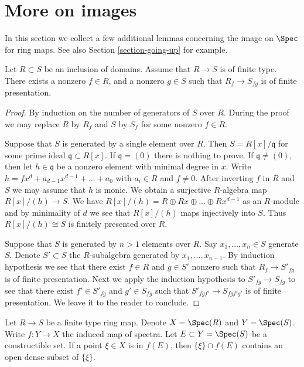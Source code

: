 \section{More on images}
\label{section-more-images}

\noindent
In this section we collect a few additional lemmas concerning the image
on $\Spec$ for ring maps. See also Section \ref{section-going-up}
for example.

\begin{lemma}
\label{lemma-generic-finite-presentation}
Let $R \subset S$ be an inclusion of domains.
Assume that $R \to S$ is of finite type.
There exists a nonzero $f \in R$, and a nonzero $g \in S$
such that $R_f \to S_{fg}$ is of finite presentation.
\end{lemma}

\begin{proof}
By induction on the number of generators of $S$ over $R$.
During the proof we may replace $R$ by $R_f$ and $S$ by $S_f$
for some nonzero $f \in R$.

\medskip\noindent
Suppose that $S$ is generated by a single element
over $R$. Then $S = R[x]/\mathfrak q$ for some
prime ideal $\mathfrak q \subset R[x]$. If $\mathfrak q = (0)$
there is nothing to prove. If $\mathfrak q \not = (0)$,
then let $h \in \mathfrak q$ be a nonzero element with minimal
degree in $x$. Write $h = f x^d + a_{d - 1} x^{d - 1} + \ldots + a_0$
with $a_i \in R$ and $f \not = 0$. After inverting $f$
in $R$ and $S$ we may assume that $h$ is monic. We obtain
a surjective $R$-algebra map $R[x]/(h) \to S$.
We have $R[x]/(h) = R \oplus Rx \oplus \ldots \oplus Rx^{d - 1}$
as an $R$-module and by minimality of $d$ we see that
$R[x]/(h)$ maps injectively into $S$. Thus $R[x]/(h) \cong S$
is finitely presented over $R$.

\medskip\noindent
Suppose that $S$ is generated by $n > 1$ elements over $R$.
Say $x_1, \ldots, x_n \in S$ generate $S$. Denote $S' \subset S$
the $R$-subalgebra generated by $x_1, \ldots, x_{n-1}$. By induction
hypothesis we see that there exist $f\in R$ and $g \in S'$
nonzero such that $R_f \to S'_{fg}$ is of finite presentation.
Next we apply the induction hypothesis to $S'_{fg} \to S_{fg}$
to see that there exist $f' \in S'_{fg}$ and
$g' \in S_{fg}$ such that $S'_{fgf'} \to S_{fgf'g'}$
is of finite presentation. We leave it to the reader to conclude.
\end{proof}

\begin{lemma}
\label{lemma-characterize-image-finite-type}
Let $R \to S$ be a finite type ring map.
Denote $X = \Spec(R)$ and $Y = \Spec(S)$.
Write $f : Y \to X$ the induced
map of spectra. Let $E \subset Y = \Spec(S)$ be a
constructible set.
If a point $\xi \in X$ is in $f(E)$, then
$\overline{\{\xi\}} \cap f(E)$ contains an open
dense subset of $\overline{\{\xi\}}$.
\end{lemma}

